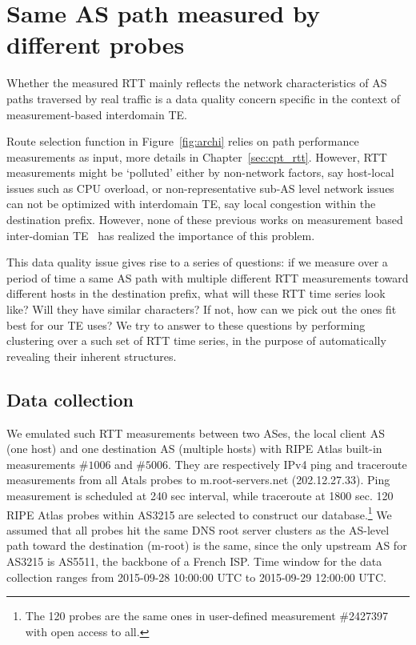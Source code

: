 \section{Same AS path measured by different probes}
Whether the measured RTT mainly reflects the network characteristics of AS paths traversed by real traffic is a data quality concern specific in the context of measurement-based interdomain TE.

Route selection function in Figure~\ref{fig:archi} relies on path performance measurements as input, more details in Chapter~\ref{sec:cpt_rtt}.
However, RTT measurements might be `polluted' either by non-network factors, say host-local issues such as CPU overload, or non-representative sub-AS level network issues can not be optimized with interdomain TE, say local congestion within the destination prefix.
However, none of these previous works on measurement based inter-domian TE~\cite{Goldenberg2004, Akella2008} has realized the importance of this problem.

This data quality issue gives rise to a series of questions: if we measure over a period of time a same AS path with multiple different RTT measurements toward different hosts in the destination prefix, what will these RTT time series look like? Will they have similar characters? If not, how can we pick out the ones fit best for our TE uses?
We try to answer to these questions by performing clustering over a such set of RTT time series, in the purpose of automatically revealing their inherent structures.

\subsection{Data collection}
We emulated such RTT measurements between two ASes, the local client AS (one host) and one destination AS (multiple hosts) with RIPE Atlas built-in measurements $\#1006$ and $\#5006$.
They are respectively IPv4 ping and traceroute measurements from all Atals probes to m.root-servers.net (202.12.27.33). 
Ping measurement is scheduled at 240 sec interval, while traceroute at 1800 sec.
120 RIPE Atlas probes within AS3215 are selected to construct our database.\footnote{The 120 probes are the same ones in user-defined measurement \#2427397 with open access to all.}
We assumed that all probes hit the same DNS root server clusters as the AS-level path toward the destination (m-root) is the same, since the only upstream AS for AS3215 is AS5511, the backbone of a French \ac{ISP}. Time window for the data collection ranges from 2015-09-28 10:00:00 UTC to 2015-09-29 12:00:00 UTC.

